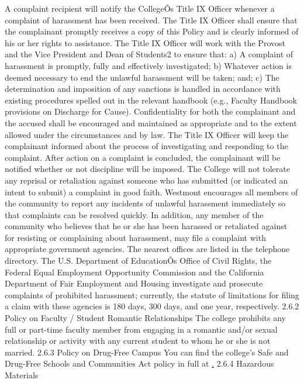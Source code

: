 \documentclass[letterpaper, 11pt]{article}
\begin{document}
	A complaint recipient will notify the CollegeÕs Title IX Officer whenever a complaint of harassment has been received.  The Title IX Officer shall ensure that the complainant promptly receives a copy of this Policy and is clearly informed of his or her rights to assistance.
	The Title IX Officer will work with the Provost and the Vice President and Dean of Students2 to ensure that:
	a) A complaint of harassment is promptly, fully and effectively investigated;
	b) Whatever action is deemed necessary to end the unlawful harassment will be taken; and;
	c) The determination and imposition of any sanctions is handled in accordance with existing procedures spelled out in the relevant handbook (e.g., Faculty Handbook provisions on Discharge for Cause).
	Confidentiality for both the complainant and the accused shall be encouraged and maintained as appropriate and to the extent allowed under the circumstances and by law.
	The Title IX Officer will keep the complainant informed about the process of investigating and responding to the complaint.  After action on a complaint is concluded, the complainant will be notified whether or not discipline will be imposed.  The College will not tolerate any reprisal or retaliation against someone who has submitted (or indicated an intent to submit) a complaint in good faith.
	Westmont encourages all members of the community to report any incidents of unlawful harassment immediately so that complaints can be resolved quickly.  In addition, any member of the community who believes that he or she has been harassed or retaliated against for resisting or complaining about harassment, may file a complaint with appropriate government agencies.  The nearest offices are listed in the telephone directory. The U.S. Department of EducationÕs Office of Civil Rights, the Federal Equal Employment Opportunity Commission and the California Department of Fair Employment and Housing investigate and prosecute complaints of prohibited harassment; currently, the statute of limitations for filing a claim with these agencies is 180 days, 300 days, and one year, respectively.
	2.6.2 Policy on Faculty / Student Romantic Relationships
	The college prohibits any full or part-time faculty member from engaging in a romantic and/or sexual relationship or activity with any current student to whom he or she is not married.
	2.6.3 Policy on Drug-Free Campus
	You can find the college's Safe and Drug-Free Schools and Communities Act policy in full at \href{https://www.westmont.edu/_offices/human_resources/on_campus/handbook/2_7drugfree.html}.
	2.6.4 Hazardous Materials
\end{document}
